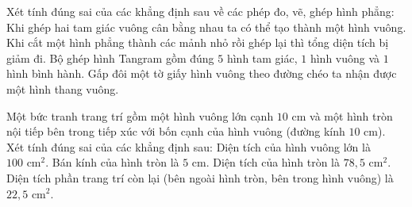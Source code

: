 \begin{ex} %
Xét tính đúng sai của các khẳng định sau về các phép đo, vẽ, ghép hình phẳng:
\choiceTF
{\True Khi ghép hai tam giác vuông cân bằng nhau ta có thể tạo thành một hình vuông.}
{Khi cắt một hình phẳng thành các mảnh nhỏ rồi ghép lại thì tổng diện tích bị giảm đi.}
{\True Bộ ghép hình Tangram gồm đúng $5$ hình tam giác, $1$ hình vuông và $1$ hình bình hành.}
{Gấp đôi một tờ giấy hình vuông theo đường chéo ta nhận được một hình thang vuông.}
\end{ex}

\begin{ex} %
Một bức tranh trang trí gồm một hình vuông lớn cạnh $10\text{ cm}$ và một hình tròn nội tiếp bên trong tiếp xúc với bốn cạnh của hình vuông (đường kính $10\text{ cm}$). Xét tính đúng sai của các khẳng định sau:
\choiceTF
{\True Diện tích của hình vuông lớn là $100\text{ cm}^2$.}
{\True Bán kính của hình tròn là $5\text{ cm}$.}
{\True Diện tích của hình tròn là $78{,}5\text{ cm}^2$.}
{Diện tích phần trang trí còn lại (bên ngoài hình tròn, bên trong hình vuông) là $22{,}5\text{ cm}^2$.}
\end{ex}

